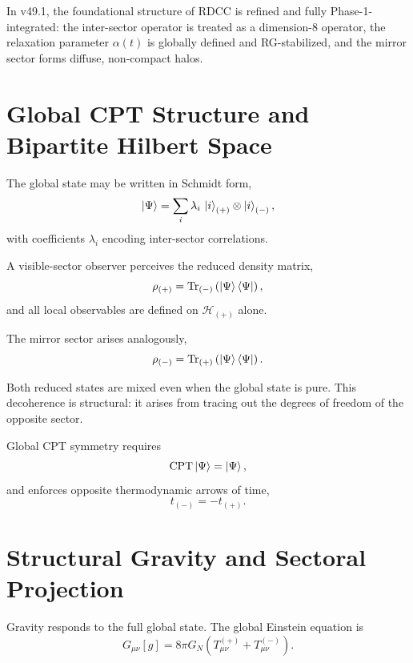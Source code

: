 \documentclass[11pt,a4paper]{article}
\begin{document}
In v49.1, the foundational structure of RDCC is refined and fully Phase-1-
integrated: the inter-sector operator is treated as a dimension-8 operator, the
relaxation parameter $\alpha(t)$ is globally defined and RG-stabilized, and the
mirror sector forms diffuse, non-compact halos.
\section[Global CPT Structure]{Global CPT Structure and Bipartite Hilbert Space}

The global state may be written in Schmidt form,
\begin{equation}
\ket{\Psi}
=
\sum_{i} \lambda_{i}\,
\ket{i}_{(+)} \otimes \ket{i}_{(-)},
\end{equation}
with coefficients $\lambda_{i}$ encoding inter-sector correlations.

A visible-sector observer perceives the reduced density matrix,
\begin{equation}
\rho_{(+)}
=
\mathrm{Tr}_{(-)}\left(\ket{\Psi}\bra{\Psi}\right),
\end{equation}
and all local observables are defined on $\mathcal{H}_{(+)}$ alone.

The mirror sector arises analogously,
\begin{equation}
\rho_{(-)}
=
\mathrm{Tr}_{(+)}\left(\ket{\Psi}\bra{\Psi}\right).
\end{equation}

Both reduced states are mixed even when the global state is pure. This
decoherence is structural: it arises from tracing out the degrees of freedom of
the opposite sector.

Global CPT symmetry requires
\begin{equation}
\mathrm{CPT}\ket{\Psi} = \ket{\Psi},
\end{equation}
and enforces opposite thermodynamic arrows of time,
\begin{equation}
t_{(-)} = - t_{(+)}.
\end{equation}
\section{Structural Gravity and Sectoral Projection}

Gravity responds to the full global state. The global Einstein equation is
\begin{equation}
G_{\mu\nu}[g]
=
8\pi G_{N}\left(
T^{(+)}_{\mu\nu}
+
T^{(-)}_{\mu\nu}
\right).
\label{eq:globalEinstein}
\end{equation}
\end{document}
